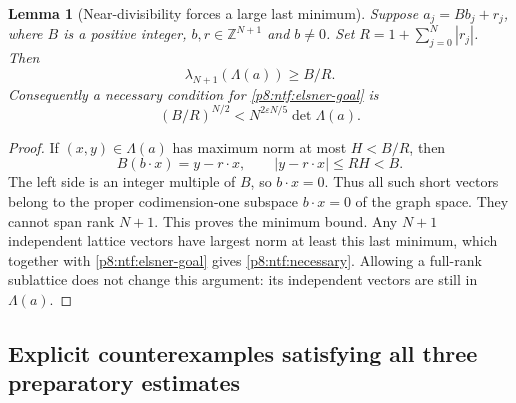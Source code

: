 \documentclass[11pt,a4paper]{article}
\newtheorem{lemma}[theorem]{Lemma}
\theoremstyle{definition}
\theoremstyle{remark}
\numberwithin{equation}{section}
\begin{document}
\begin{lemma}[Near-divisibility forces a large last minimum]
\label{p8:ntf:congruence}
Suppose $a_j=Bb_j+r_j$, where $B$ is a positive integer,
$b,r\in\mathbb Z^{N+1}$ and $b\ne0$.  Set
$R=1+\sum_{j=0}^N|r_j|$.  Then
\[
 \lambda_{N+1}(\Lambda(a))\geq B/R.
\]
Consequently a necessary condition for \eqref{p8:ntf:elsner-goal} is
\begin{equation}\label{p8:ntf:necessary}
 (B/R)^{N/2}<N^{2\varepsilon N/5}\det\Lambda(a).
\end{equation}
\end{lemma}
\begin{proof}
If $(x,y)\in\Lambda(a)$ has maximum norm at most $H<B/R$, then
\[
 B(b\cdot x)=y-r\cdot x,\qquad |y-r\cdot x|\leq RH<B.
\]
The left side is an integer multiple of $B$, so $b\cdot x=0$.
Thus all such short vectors belong to the proper codimension-one
subspace $b\cdot x=0$ of the graph space.  They cannot span rank
$N+1$.  This proves the minimum bound.  Any $N+1$ independent
lattice vectors have largest norm at least this last minimum,
which together with \eqref{p8:ntf:elsner-goal} gives
\eqref{p8:ntf:necessary}.  Allowing a full-rank sublattice does not change
this argument: its independent vectors are still in $\Lambda(a)$.
\end{proof}

\subsection{Explicit counterexamples satisfying all three preparatory estimates}
\end{document}
